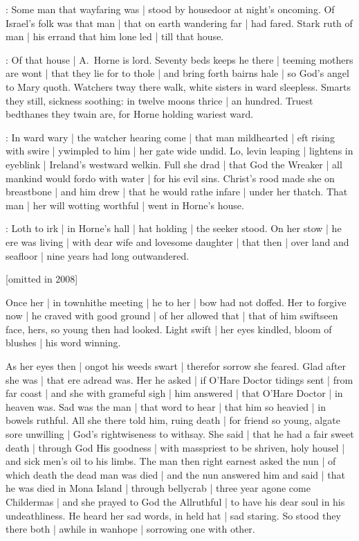 

:
Some man that wayfaring was |
stood by housedoor at night's oncoming.
Of Israel's folk was that man |
that on earth wandering far |
had fared.
Stark ruth of man |
his errand that him lone led |
till that house.


:
Of that house |
A.~Horne is lord.
Seventy beds keeps he there |
teeming mothers are wont |
that they lie for to thole |
and bring forth bairns hale |
so God's angel to Mary quoth.
Watchers tway there walk,
white sisters in ward sleepless.
Smarts they still,
sickness soothing:
in twelve moons thrice |
an hundred.
Truest bedthanes they twain are,
for Horne holding wariest ward.


:
In ward wary |
the watcher hearing come |
that man mildhearted |
eft rising with swire |
ywimpled to him |
her gate wide undid.
Lo,
levin leaping |
lightens in eyeblink |
Ireland's westward welkin.
Full she drad |
that God the Wreaker |
all mankind would fordo with water |
for his evil sins.
Christ's rood made she on breastbone |
and him drew |
that he would rathe infare |
under her thatch.
That man |
her will wotting worthful |
went in Horne's house.



:
Loth to irk |
in Horne's hall |
hat holding |
the seeker stood.
On her stow |
he ere was living |
with dear wife and lovesome daughter |
that then |
over land and seafloor |
nine years had long outwandered.

[omitted in 2008]

Once her |
in townhithe meeting |
he to her |
bow had not doffed.
Her to forgive now |
he craved with good ground |
of her allowed that |
that of him swiftseen face,
hers,
so young then had looked.
Light swift |
her eyes kindled,
bloom of blushes |
his word winning.


As her eyes then |
ongot his weeds swart |
therefor sorrow she feared.
Glad after she was |
that ere adread was.
Her he asked |
if O'Hare Doctor tidings sent |
from far coast |
and she with grameful sigh |
him answered |
that O'Hare Doctor |
in heaven was.
Sad was the man |
that word to hear |
that him so heavied |
in bowels ruthful.
All she there told him,
ruing death |
for friend so young,
algate sore unwilling |
God's rightwiseness to withsay.
She said |
that he had a fair sweet death |
through God His goodness |
with masspriest to be shriven,
holy housel |
and sick men's oil to his limbs.
The man then right earnest asked the nun |
of which death the dead man was died |
and the nun answered him and said |
that he was died in Mona Island |
through bellycrab |
three year agone come Childermas |
and she prayed to God the Allruthful |
to have his dear soul in his undeathliness.
He heard her sad words,
in held hat |
sad staring.
So stood they there both |
awhile in wanhope |
sorrowing one with other.

